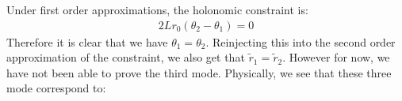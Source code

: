 \documentclass{article}
\begin{document}
\subsubsection{} %

Under first order approximations, the holonomic constraint is:
\begin{align*}
	2Lr_0(\theta_2 - \theta_1) = 0
\end{align*}
Therefore it is clear that we have $\theta_1 = \theta_2$. Reinjecting this into the second order approximation of the constraint, we also get that $\tilde{r}_1 = \tilde{r}_2$. However for now, we have not been able to prove the third mode. Physically, we see that these three mode correspond to:
\end{document}
